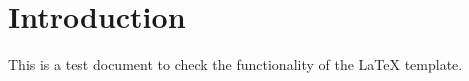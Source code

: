 \documentclass{test20250425}
\begin{document}
\section{Introduction}

This is a test document to check the functionality of the LaTeX template.

\end{document}
